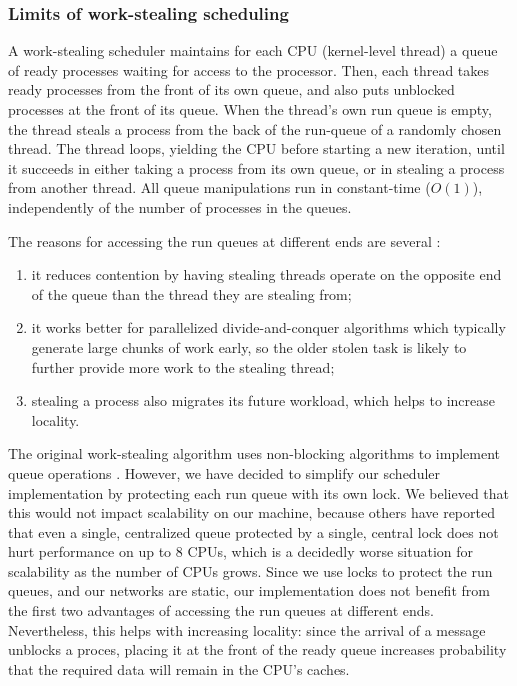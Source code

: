 \subsubsection{Limits of work-stealing scheduling \cite{Vrba2009}}

A work-stealing scheduler maintains for each CPU (kernel-level thread)
a queue of ready processes waiting for access to the processor. Then,
each thread takes ready processes from the front of its own queue, and
also puts unblocked processes at the front of its queue. When the
thread's own run queue is empty, the thread steals a process from the
back of the run-queue of a randomly chosen thread. The thread loops,
yielding the CPU before starting a new iteration, until it succeeds in
either taking a process from its own queue, or in stealing a process
from another thread. All queue manipulations run in constant-time
($O(1)$), independently of the number of processes in the queues.

The reasons for accessing the run queues at different ends are several
\cite{Frigo1998}:
\begin{enumerate}
\item it reduces contention by having stealing threads operate on the
  opposite end of the queue than the thread they are stealing from;
\item it works better for parallelized divide-and-conquer algorithms
  which typically generate large chunks of work early, so the older
  stolen task is likely to further provide more work to the stealing
  thread;
\item stealing a process also migrates its future workload, which
  helps to increase locality.
\end{enumerate}

The original work-stealing algorithm uses non-blocking algorithms to
implement queue operations \cite{Arora2001}. However, we have decided
to simplify our scheduler implementation by protecting each run queue
with its own lock. We believed that this would not impact scalability
on our machine, because others \cite{Saha2007} have reported that even
a single, centralized queue protected by a single, central lock does
not hurt performance on up to 8 CPUs, which is a decidedly worse
situation for scalability as the number of CPUs grows. Since we use
locks to protect the run queues, and our networks are static, our
implementation does not benefit from the first two advantages of
accessing the run queues at different ends.  Nevertheless, this helps
with increasing locality: since the arrival of a message unblocks a
proces, placing it at the front of the ready queue increases
probability that the required data will remain in the CPU's caches.

